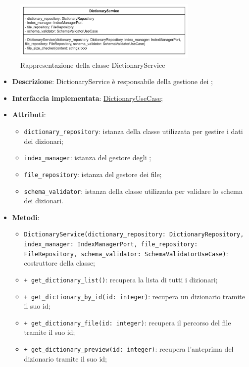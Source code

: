  \label{DictionaryService}
\begin{figure}[H]
    \centering
    \includegraphics[width=0.8\textwidth]{assets/Backend/dictionary_service.png}
    \caption{Rappresentazione della classe DictionaryService}
  \end{figure}
\begin{itemize}
    \item \textbf{Descrizione}: DictionaryService è responsabile della gestione dei ;
    \item \textbf{Interfaccia implementata}: \hyperref[DictionaryUseCase]{DictionaryUseCase};
    \item \textbf{Attributi}:
    \begin{itemize}
        \item \texttt{dictionary\_repository}: istanza della classe utilizzata per gestire i dati dei dizionari;
        \item \texttt{index\_manager}: istanza del gestore degli ;
        \item \texttt{file\_repository}: istanza del gestore dei file;
        \item \texttt{schema\_validator}: istanza della classe utilizzata per validare lo schema dei dizionari.
    \end{itemize}
    \item \textbf{Metodi}:
    \begin{itemize}
        \item \texttt{DictionaryService(dictionary\_repository: DictionaryRepository, index\_manager: IndexManagerPort, file\_repository: FileRepository, schema\_validator: SchemaValidatorUseCase)}: costruttore della classe;
        \item \texttt{+ get\_dictionary\_list()}: recupera la lista di tutti i dizionari;
        \item \texttt{+ get\_dictionary\_by\_id(id: integer)}: recupera un dizionario tramite il suo id;
        \item \texttt{+ get\_dictionary\_file(id: integer)}: recupera il percorso del file tramite il suo id;
        \item \texttt{+ get\_dictionary\_preview(id: integer)}: recupera l'anteprima del dizionario tramite il suo id;

\end{itemize}
\end{itemize}
